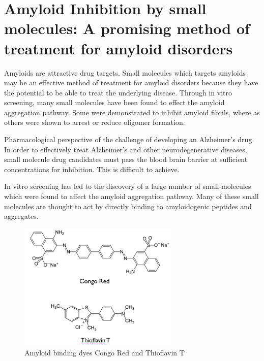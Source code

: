 \section{Amyloid Inhibition by small molecules: A promising method of treatment for amyloid disorders}

	


Amyloids are attractive drug targets. Small molecules which targets amyloids may be an effective method of treatment for amyloid disorders because they have the potential to be able to treat the underlying disease. Through in vitro screening, many small molecules have been found to effect the amyloid aggregation pathway.  Some were demonstrated to inhibit amyloid fibrils, where as others were shown to arrest or reduce oligomer formation.
  
Pharmacological perspective of the challenge of developing an Alzheimer's drug. In order to effectively treat Alzheimer's and other neurodegenerative diseases, small molecule drug candidates must pass the blood brain barrier at sufficient concentrations for inhibition.  This is difficult to achieve.
      
In vitro screening has led to the discovery of a large number of small-molecules which were found to affect the amyloid aggregation pathway. Many of these small molecules are thought to act by directly binding to amyloidogenic peptides and aggregates.

\begin{figure}
\centering
\includegraphics[width=3in]{figures/introduction/dyes.png}
\caption[Small molecule binders]{Amyloid binding dyes Congo Red and Thioflavin T}
\label{fig:amyloid_dyes}
\end{figure}

